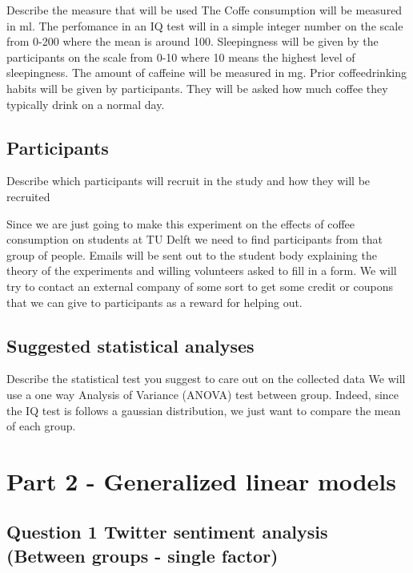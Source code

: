 \documentclass[]{article}
\begin{document}
Describe the measure that will be used The Coffe consumption will be
measured in ml. The perfomance in an IQ test will in a simple integer
number on the scale from 0-200 where the mean is around 100.
Sleepingness will be given by the participants on the scale from 0-10
where 10 means the highest level of sleepingness. The amount of caffeine
will be measured in mg. Prior coffeedrinking habits will be given by
participants. They will be asked how much coffee they typically drink on
a normal day.

\subsection{Participants}\label{participants}

Describe which participants will recruit in the study and how they will
be recruited

Since we are just going to make this experiment on the effects of coffee
consumption on students at TU Delft we need to find participants from
that group of people. Emails will be sent out to the student body
explaining the theory of the experiments and willing volunteers asked to
fill in a form. We will try to contact an external company of some sort
to get some credit or coupons that we can give to participants as a
reward for helping out.

\subsection{Suggested statistical
analyses}\label{suggested-statistical-analyses}

Describe the statistical test you suggest to care out on the collected
data We will use a one way Analysis of Variance (ANOVA) test between
group. Indeed, since the IQ test is follows a gaussian distribution, we
just want to compare the mean of each group.

\section{Part 2 - Generalized linear
models}\label{part-2---generalized-linear-models}

\subsection{Question 1 Twitter sentiment analysis (Between groups -
single
factor)}\label{question-1-twitter-sentiment-analysis-between-groups---single-factor}
\end{document}
